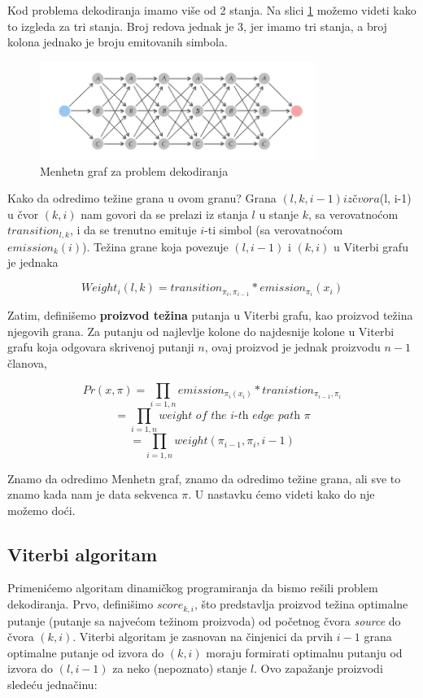 Kod problema dekodiranja imamo više od 2 stanja. Na slici \ref{slika: menhetn} možemo videti kako to izgleda za tri stanja. Broj redova jednak je 3, jer imamo tri stanja, a broj kolona jednako je broju emitovanih simbola. 

\begin{figure}[H]
\centering
\includegraphics[width=0.8\textwidth]{poglavlja/10/slike/Menhetn_graf.png}
\caption{Menhetn graf za problem dekodiranja}
\label{slika: menhetn}
\end{figure}

Kako da odredimo težine grana u ovom granu? Grana $(l, k, i-1) iz čvora $(l, i-1) u čvor $(k, i)$ nam govori da se prelazi iz stanja $l$ u stanje $k$, sa verovatnoćom $transition_{l, k}$, i da se trenutno emituje $i$-ti simbol (sa verovatnoćom $emission_k(i)$). Težina grane koja povezuje $(l, i-1) $ i $ (k, i) $ u Viterbi grafu je jednaka

\begin{equation}
    Weight_i(l, k) = transition_{\pi_i, \pi_{i-1}}*emission_{\pi_i}(x_i)
\end{equation}

Zatim, definišemo \textbf{proizvod težina} putanja u Viterbi grafu, kao proizvod težina njegovih grana. Za putanju od najlevlje kolone do najdesnije kolone u Viterbi grafu koja odgovara skrivenoj putanji $ n $, ovaj proizvod je jednak proizvodu $ n-1 $ članova,


$$Pr(x, \pi) = \prod_{i=1, n} emission_{\pi_i(x_i)} * tranistion_{\pi_{i-1}, \pi_i}$$
$$  = \prod_{i=1, n} \textit{weight of the i-th edge path } \pi$$
$$ = \prod_{i=1, n} weight(\pi_{i-1}, \pi_i, i-1)$$


Znamo da odredimo Menhetn graf, znamo da odredimo težine grana, ali sve to znamo kada nam je data sekvenca $\pi$. U nastavku ćemo videti kako do nje možemo doći.


\subsection{Viterbi algoritam}

Primenićemo algoritam dinamičkog programiranja da bismo rešili problem dekodiranja. Prvo, definišimo $ score_{k, i} $, što predstavlja proizvod težina optimalne putanje (putanje sa najvećom težinom proizvoda) od početnog čvora \textit{source} do čvora $ (k, i) $. Viterbi algoritam je zasnovan na činjenici da prvih $ i-1 $ grana optimalne putanje od izvora do $ (k, i) $ moraju formirati optimalnu putanju od izvora do $ (l, i-1) $ za neko (nepoznato) stanje $ l $. Ovo zapažanje proizvodi sledeću jednačinu:

